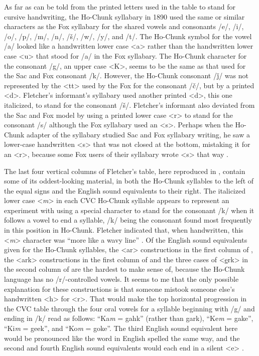 \documentclass[output=paper]{LSP/langsci}
\begin{document}
As far as can be told from the printed letters used in the table to stand for cursive handwriting, the Ho-Chunk syllabary in 1890 used the same or similar characters as the Fox syllabary for the shared vowels and consonants /e/, /i/, /o/, /p/, /m/, /n/, /\v{s}/, /w/, /y/, and /t/. The Ho-Chunk symbol for the vowel /a/ looked like a handwritten lower case <a> rather than the handwritten lower case <u> that stood for /a/ in the Fox syllabary. The Ho-Chunk character for the consonant /g/, an upper case <K>, seems to be the same as that used for the Sac and Fox consonant /k/. However, the Ho-Chunk consonant /\v{j}/ was not represented by the <tt> used by the Fox for the consonant /\v{c}/, but by a printed <d>. Fletcher's informant's syllabary used another printed <d>, this one italicized, to stand for the consonant /\v{s}/. Fletcher's informant also deviated from the Sac and Fox model by using a printed lower case <r> to stand for the consonant /s/ although the Fox syllabary used an <s>. Perhaps when the Ho-Chunk adapter of the syllabary studied Sac and Fox syllabary writing, he saw a lower-case handwritten <s> that was not closed at the bottom, mistaking it for an <r>, because some Fox users of their syllabary wrote <s> that way \citep[170]{Walker1996}.  

The last four vertical columns of Fletcher's table, here reproduced in , contain some of its oddest-looking material, in both the Ho-Chunk syllables to the left of the equal signs and the English sound equivalents to their right. The italicized lower case <\emph{m}> in each CVC Ho-Chunk syllable appears to represent an experiment with using a special character to stand for the consonant /k/ when it follows a vowel to end a syllable, /k/ being the consonant found most frequently in this position in Ho-Chunk. Fletcher indicated that, when handwritten, this <\emph{m}> character was ``more like a wavy line'' \citeyearpar[300]{Fletcher1890a}. Of the English sound equivalents given for the Ho-Chunk syllables, the <ar> constructions in the first column of , the <ark> constructions in the first column of  and the three cases of <\underline{e}rk> in the second column of  are the hardest to make sense of, because the Ho-Chunk language has no /r/-controlled vowels. It seems to me that the only possible explanation for these constructions is that someone mistook someone else's handwritten <h> for <r>. That would make the top horizontal progression in the CVC table through the four oral vowels for a syllable beginning with /g/ and ending in /k/ read as follows: ``Ka\emph{m} = gahk'' (rather than gark), ``Ke\emph{m} = gake'', ``Ki\emph{m} = geek'', and ``Ko\emph{m} = goke''. The third English sound equivalent here would be pronounced like the word in English spelled the same way, and the second and fourth English sound equivalents would each end in a silent <e> \citep[300]{Fletcher1890a}. 
\end{document}
